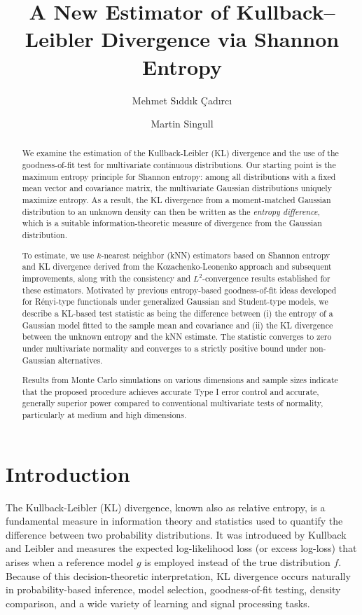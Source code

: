 \documentclass[12pt,a4paper]{article}
\title{A New Estimator of Kullback--Leibler Divergence via Shannon Entropy}
\author[1]{\footnotesize Mehmet S\i dd\i k \c{C}ad\i rc\i}
\author[2*]{\footnotesize Martin Singull}
\affil[1]{\footnotesize Faculty of Science, Department of Statistics, Cumhuriyet University, Sivas, T\"urkiye}
\affil[2]{\footnotesize Department of Mathematics, Link\"oping University, Link\"oping, Sweden}
\affil[*]{\footnotesize Corresponding author: \href{mailto:martin.singull@liu.se}{\texttt{martin.singull@liu.se}}}
\date{}
\theoremstyle{definition}
\theoremstyle{plain}
\begin{document}
\maketitle


\begin{abstract}
We examine the estimation of the Kullback-Leibler (KL) divergence and the use of the goodness-of-fit test for multivariate continuous distributions. Our starting point is the maximum entropy principle for Shannon entropy: among all distributions with a fixed mean vector and covariance matrix, the multivariate Gaussian distributions uniquely maximize entropy. As a result, the KL divergence from a moment-matched Gaussian distribution to an unknown density can then be written as the \emph{entropy difference}, which is a suitable information-theoretic measure of divergence from the Gaussian distribution.


To estimate, we use $k$-nearest neighbor (kNN) estimators based on Shannon entropy and KL divergence derived from the Kozachenko-Leonenko approach and subsequent improvements, along with the consistency and $L^{2}$-convergence results established for these estimators. Motivated by previous entropy-based goodness-of-fit ideas developed for Rényi-type functionals under generalized Gaussian and Student-type models, we describe a KL-based test statistic as being the difference between (i) the entropy of a Gaussian model fitted to the sample mean and covariance and (ii) the KL divergence between the unknown entropy and the kNN estimate. The statistic converges to zero under multivariate normality and converges to a strictly positive bound under non-Gaussian alternatives.

Results from Monte Carlo simulations on various dimensions and sample sizes indicate that the proposed procedure achieves accurate Type I error control and accurate, generally superior power compared to conventional multivariate tests of normality, particularly at medium and high dimensions.

\end{abstract}


\section{Introduction}
\label{sec:intro}

The Kullback-Leibler (KL) divergence, known also as relative entropy, is a fundamental measure in information theory and statistics used to quantify the difference between two probability distributions. It was introduced by Kullback and
Leibler \cite{Kullback1951} and measures the expected log-likelihood loss (or excess log-loss) that arises when a reference model $g$ is employed instead of the true distribution $f$. Because of this decision-theoretic interpretation, KL divergence occurs naturally in probability-based inference, model selection, goodness-of-fit testing, density comparison, and a wide variety of learning and signal processing tasks.
\end{document}
